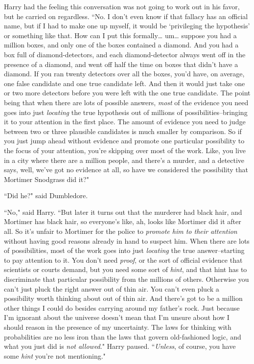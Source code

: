 Harry had the feeling this conversation was not going to work out in his favor, but he carried on regardless. ``No. I don't even know if that fallacy has an official name, but if I had to make one up myself, it would be `privileging the hypothesis' or something like that. How can I put this formally{\ldots} um{\ldots} suppose you had a million boxes, and only one of the boxes contained a diamond. And you had a box full of diamond-detectors, and each diamond-detector always went off in the presence of a diamond, and went off half the time on boxes that didn't have a diamond. If you ran twenty detectors over all the boxes, you'd have, on average, one false candidate and one true candidate left. And then it would just take one or two more detectors before you were left with the one true candidate. The point being that when there are lots of possible answers, \emph{most} of the evidence you need goes into just \emph{locating} the true hypothesis out of millions of possibilities\---bringing it to your attention in the first place. The amount of evidence you need to judge between two or three plausible candidates is much smaller by comparison. So if you just jump ahead without evidence and promote one particular possibility to the focus of your attention, you're skipping over most of the work. Like, you live in a city where there are a million people, and there's a murder, and a detective says, well, we've got no evidence at all, so have we considered the possibility that Mortimer Snodgrass did it?"

``Did he?" said Dumbledore.

``No," said Harry. ``But later it turns out that the murderer had black hair, and Mortimer has black hair, so everyone's like, ah, looks like Mortimer did it after all. So it's unfair to Mortimer for the police to \emph{promote him to their attention} without having good reasons already in hand to suspect him. When there are lots of possibilities, most of the work goes into just \emph{locating} the true answer\---starting to pay attention to it. You don't need \emph{proof}, or the sort of official evidence that scientists or courts demand, but you need some sort of \emph{hint}, and that hint has to discriminate that particular possibility from the millions of others. Otherwise you can't just pluck the right answer out of thin air. You can't even pluck a possibility worth thinking about out of thin air. And there's got to be a million other things I could do besides carrying around my father's rock. Just because I'm ignorant about the universe doesn't mean that I'm unsure about how I should reason in the presence of my uncertainty. The laws for thinking with probabilities are no less iron than the laws that govern old-fashioned logic, and what you just did is \emph{not allowed}." Harry paused. ``\emph{Unless}, of course, you have some \emph{hint} you're not mentioning."

